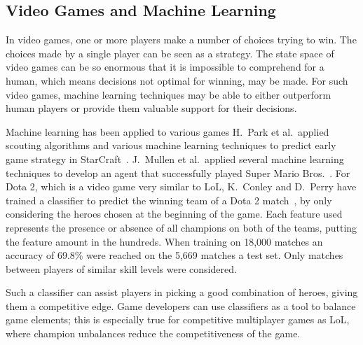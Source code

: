 \subsection{Video Games and Machine Learning}\label{sec:mlandonlinevideogames}
In video games, one or more players make a number of choices trying to win. The choices made by a single player can be seen as a strategy. The state space of video games can be so enormous that it is impossible to comprehend for a human, which means decisions not optimal for winning, may be made. For such video games, machine learning techniques may be able to either outperform human players or provide them valuable support for their decisions.

Machine learning has been applied to various games H.\ Park et al.\ applied scouting algorithms and various machine learning techniques to predict early game strategy in StarCraft~\cite{Park:2012:PES:2425296.2425298}. J.\ Mullen et al.\ applied several machine learning techniques to develop an agent that successfully played Super Mario Bros.~\cite{supermario}. For Dota 2, which is a video game very similar to LoL, K.\ Conley and D.\ Perry have trained a classifier to predict the winning team of a Dota 2 match~\cite{dota2article}, by only considering the heroes chosen at the beginning of the game. Each feature used represents the presence or absence of all champions on both of the teams, putting the feature amount in the hundreds. When training on 18,000 matches an accuracy of 69.8\% were reached on the 5,669 matches a test set. Only matches between players of similar skill levels were considered. 

Such a classifier can assist players in picking a good combination of heroes, giving them a competitive edge. Game developers can use classifiers as a tool to balance game elements; this is especially true for competitive multiplayer games as LoL, where champion unbalances reduce the competitiveness of the game.

%
%



